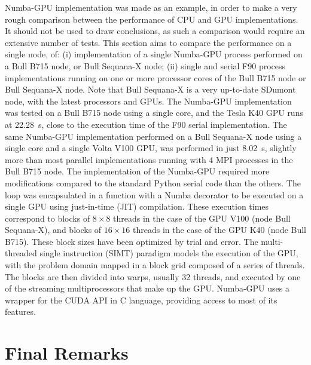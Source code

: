 \documentclass[12pt]{article}
\begin{document}
Numba-GPU implementation was made as an example, in order to make a very rough comparison between the performance of CPU and GPU implementations. It should not be used to draw conclusions, as such a comparison would require an extensive number of tests. This section aims to compare the performance on a single node, of: (i) implementation of a single Numba-GPU process performed on a Bull B715 node, or Bull Sequana-X node; (ii) single and serial F90 process implementations running on one or more processor cores of the Bull B715 node or Bull Sequana-X node. Note that Bull Sequana-X is a very up-to-date SDumont node, with the latest processors and GPUs. The Numba-GPU implementation was tested on a Bull B715 node using a single core, and the Tesla K40 GPU runs at 22.28~s, close to the execution time of the F90 serial implementation. The same Numba-GPU implementation performed on a Bull Sequana-X node using a single core and a single Volta V100 GPU, was performed in just 8.02~s, slightly more than most parallel implementations running with 4 MPI processes in the Bull B715 node. The implementation of the Numba-GPU required more modifications compared to the standard Python serial code than the others.
The loop was encapsulated in a function with a Numba decorator to be executed on a single GPU using just-in-time (JIT) compilation. These execution times correspond to blocks of $ 8 \times 8 $ threads in the case of the GPU V100 (node Bull Sequana-X), and blocks of $ 16 \times 16 $ threads in the case of the GPU K40 (node Bull B715). These block sizes have been optimized by trial and error. The multi-threaded single instruction (SIMT) paradigm models the execution of the GPU, with the problem domain mapped in a block grid composed of a series of threads. The blocks are then divided into warps, usually 32 threads, and executed by one of the streaming multiprocessors that make up the GPU. Numba-GPU uses a wrapper for the CUDA API in C language, providing access to most of its features. 










\section{Final Remarks}
\label{sec:conclusao}
\end{document}
